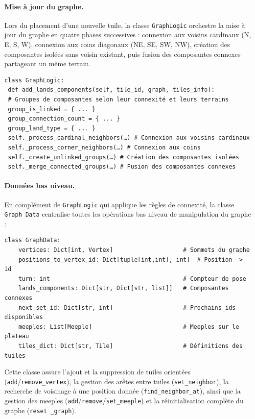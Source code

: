 \documentclass[11pt]{article}
\begin{document}
\paragraph{Mise à jour du graphe.}
Lors du placement d'une nouvelle tuile, la classe \texttt{GraphLogic} 
orchestre la mise à jour du graphe en quatre phases successives : 
connexion aux voisins cardinaux (N, E, S, W), connexion aux coins 
diagonaux (NE, SE, SW, NW), création des composantes isolées sans 
voisin existant, puis fusion des composantes connexes partageant un 
même terrain.


{\normalsize
  \begin{verbatim}
class GraphLogic:
 def add_lands_components(self, tile_id, graph, tiles_info):
 # Groupes de composantes selon leur connexité et leurs terrains
 group_is_linked = { ... }
 group_connection_count = { ... }
 group_land_type = { ... }
 self._process_cardinal_neighbors(…) # Connexion aux voisins cardinaux
 self._process_corner_neighbors(…) # Connexion aux coins
 self._create_unlinked_groups(…) # Création des composantes isolées
 self._merge_connected_groups(…) # Fusion des composantes connexes
\end{verbatim}
}

\paragraph{Données bas niveau.}
En complément de \texttt{GraphLogic} qui applique les règles de 
connexité, la classe \texttt{Graph \allowbreak Data} centralise toutes les 
opérations bas niveau de manipulation du graphe :

{\normalsize
\begin{verbatim}
class GraphData:
    vertices: Dict[int, Vertex]                    # Sommets du graphe
    positions_to_vertex_id: Dict[tuple[int,int], int]  # Position -> id
    turn: int                                      # Compteur de pose
    lands_components: Dict[str, Dict[str, list]]   # Composantes connexes
    next_set_id: Dict[str, int]                    # Prochains ids disponibles
    meeples: List[Meeple]                          # Meeples sur le plateau
    tiles_dict: Dict[str, Tile]                    # Définitions des tuiles
\end{verbatim}
}

Cette classe assure l'ajout et la suppression de tuiles orientées 
(\texttt{add}/\texttt{remove\_vertex}), la gestion des arêtes entre 
tuiles (\texttt{set\_neighbor}), la recherche de voisinage à une 
position donnée (\texttt{find\_neighbor\_at}), ainsi que la gestion 
des meeples (\texttt{add}/\texttt{remove}/\texttt{set\_meeple}) et 
la réinitialisation complète du graphe (\texttt{reset \allowbreak \_graph}).
\end{document}
